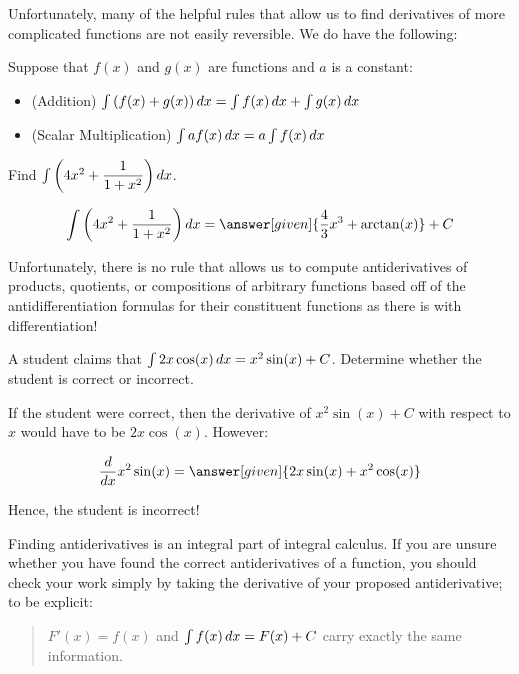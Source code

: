 \documentclass[nooutcomes]{ximera}
\begin{document}

Unfortunately, many of the helpful rules that allow us to find derivatives of more complicated functions are not easily reversible.  We do have the following:

\begin{theorem} 
Suppose that $f(x)$ and $g(x)$ are functions and $a$ is a constant:
\begin{itemize}
\item (Addition) $\int \left(f(x) + g(x) \right) \mathop{}\!d x = \int f(x) \mathop{}\!d x+\int g(x)  \mathop{}\!d x$
\item (Scalar Multiplication) $\int a f(x) \mathop{}\!d x = a \int f(x) \mathop{}\!d x$
\end{itemize}
\end{theorem}

\begin{question} 
  Find $\int \left(4x^2 + \dfrac{1}{1+x^2} \right)\mathop{}\!d x$.
  \begin{prompt} 
    \[
    \int \left(4x^2 + \dfrac{1}{1+x^2} \right) \d x  = \answer[given]{\frac{4}{3} x^3 + \arctan(x)} +C 
    \]
  \end{prompt}
\end{question}



Unfortunately, there is no rule that allows us to compute antiderivatives of products, quotients, or compositions of arbitrary functions based off of the antidifferentiation formulas for their constituent functions as there is with differentiation!  


\begin{example}
  A student claims that $\int 2x \cos(x) \mathop{}\!d x = x^2 \sin(x) +C$.  Determine whether the student is correct or incorrect.
  
  \begin{explanation}
    If the student were correct, then the derivative of $x^2 \sin(x) +C$ with respect to $x$ would have to be $2x \cos(x)$.  However:
    
      \[\ddx x^2 \sin(x) = \answer[given]{2x \sin(x) +x^2 \cos(x)} \]
      
 Hence, the student is incorrect!
  \end{explanation}
\end{example}

\begin{remark}
Finding antiderivatives is an integral part of integral calculus.  If you are unsure whether you have found the correct antiderivatives of a function, you should check your work simply by taking the derivative of your proposed antiderivative; to be explicit:

\begin{quote}
$F'(x) = f(x)$ and $\int f(x) \mathop{}\!d x = F(x)+C$ carry exactly the same information.
\end{quote}
\end{remark}
\end{document}

